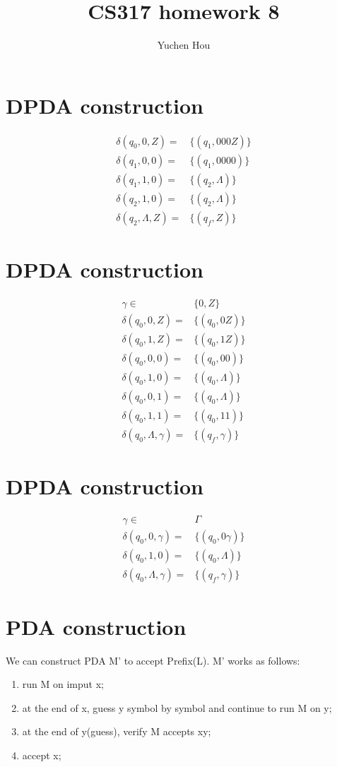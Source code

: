 \documentclass{article}
\begin{document}
\lstset{language=Java}
\title{CS317 homework 8}
\author{Yuchen Hou}
\maketitle

\section{DPDA construction}
\begin{align*}
\delta(q_0, 0, Z) =& \{(q_1, 000Z)\}\\
\delta(q_1, 0, 0) =& \{(q_1, 0000)\}\\
\delta(q_1, 1, 0) =& \{(q_2, \Lambda)\}\\
\delta(q_2, 1, 0) =& \{(q_2, \Lambda)\}\\
\delta(q_2, \Lambda, Z) =& \{(q_f, Z)\}
\end{align*}

\section{DPDA construction}
\begin{align*}
\gamma \in& \{0, Z\}\\
\delta(q_0, 0, Z) =& \{(q_0, 0 Z)\}\\
\delta(q_0, 1, Z) =& \{(q_0, 1 Z)\}\\
\delta(q_0, 0, 0) =& \{(q_0, 00)\}\\
\delta(q_0, 1, 0) =& \{(q_0, \Lambda)\}\\
\delta(q_0, 0, 1) =& \{(q_0, \Lambda)\}\\
\delta(q_0, 1, 1) =& \{(q_0, 11)\}\\
\delta(q_0, \Lambda, \gamma) =& \{(q_f, \gamma)\}
\end{align*}

\section{DPDA construction}
\begin{align*}
\gamma \in& \Gamma\\
\delta(q_0, 0, \gamma) =& \{(q_0, 0\gamma)\}\\
\delta(q_0, 1, 0) =& \{(q_0, \Lambda)\}\\
\delta(q_0, \Lambda, \gamma) =& \{(q_f, \gamma)\}
\end{align*}

\section{PDA construction}
We can construct PDA M' to accept Prefix(L). M' works as follows:
\begin{enumerate}
  \item run M on imput x;
  \item at the end of x, guess y symbol by symbol and continue to run M on y;
  \item at the end of y(guess), verify M accepts xy;
  \item accept x;
\end{enumerate}
\end{document}
